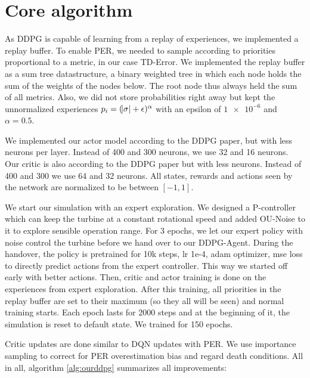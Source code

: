 \documentclass[hyperref,german,beleg]{cgvpub}
\begin{document}
\section{Core algorithm}

As DDPG is capable of learning from a replay of experiences, we implemented a replay buffer. To enable \ac{PER}, we needed to sample according to priorities proportional to a metric, in our case \ac{TD-Error}. We implemented the replay buffer as a sum tree datastructure, a binary weighted tree in which each node holds the sum of the weights of the nodes below. The root node thus always held the sum of all metrics. Also, we did not store probabilities right away but kept the unnormalized experiences $p_i = (\abs{\sigma} + \epsilon)^{\alpha}$ with an epsilon of $\num{1e-6}$ and $\alpha = 0.5$. 

We implemented our actor model according to the \ac{DDPG} paper, but with less neurons per layer. Instead of 400 and 300 neurons, we use 32 and 16 neurons. Our critic is also according to the \ac{DDPG} paper but with less neurons. Instead of 400 and 300 we use 64 and 32 neurons. All states, rewards and actions seen by the network are normalized to be between $[-1, 1]$.

We start our simulation with an expert exploration. We designed a P-controller which can keep the turbine at a constant rotational speed and added \ac{OU-Noise} to it to explore sensible operation range. For 3 epochs, we let our expert policy with noise control the turbine before we hand over to our \ac{DDPG}-Agent. During the handover, the policy is pretrained for 10k steps, lr 1e-4, adam optimizer, mse loss to directly predict actions from the expert controller. This way we started off early with better actions. Then, critic and actor training is done on the experiences from expert exploration. After this training, all priorities in the replay buffer are set to their maximum (so they all will be seen) and normal training starts. Each epoch lasts for 2000 steps and at the beginning of it, the simulation is reset to default state. We trained for 150 epochs.

Critic updates are done similar to \ac{DQN} updates with \ac{PER}. We use importance sampling to correct for \ac{PER} overestimation bias and regard death conditions. All in all, algorithm \ref{alg:ourddpg} summarizes all improvements:
\end{document}
